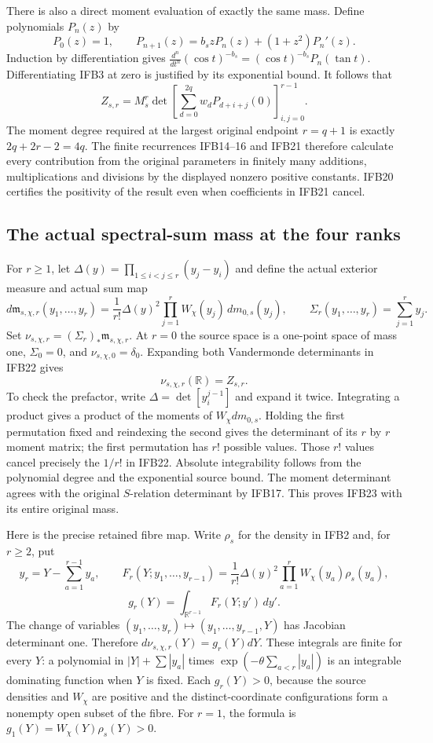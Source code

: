 There is also a direct moment evaluation of exactly the same mass.
Define polynomials $P_n(z)$ by
\[
 P_0(z)=1,\qquad
 P_{n+1}(z)=b_szP_n(z)+(1+z^2)P_n'(z).
\]
Induction by differentiation gives
$\frac{d^n}{dt^n}(\cos t)^{-b_s}
=(\cos t)^{-b_s}P_n(\tan t)$. Differentiating IFB3 at zero
is justified by its exponential bound. It follows that
\[
 \boxed{\displaystyle
 Z_{s,r}=M_s^r\det\left[
       \sum_{d=0}^{2q}w_dP_{d+i+j}(0)
                          \right]_{i,j=0}^{r-1}.}
 \tag{IFB21}
\]
The moment degree required at the largest original endpoint $r=q+1$
is exactly $2q+2r-2=4q$. The finite recurrences IFB14--16 and
IFB21 therefore calculate every contribution from the original
parameters in finitely many additions, multiplications and divisions
by the displayed nonzero positive constants. IFB20 certifies the
positivity of the result even when coefficients in IFB21 cancel.

\subsection{The actual spectral-sum mass at the four ranks}

For $r\geq1$, let $\Delta(y)=\prod_{1\leq i<j\leq r}(y_j-y_i)$
and define the actual exterior measure and actual sum map
\[
 d\mathfrak m_{s,\chi,r}(y_1,\ldots,y_r)
 =\frac1{r!}\Delta(y)^2\prod_{j=1}^r
       W_\chi(y_j)\,dm_{0,s}(y_j),\qquad
 \Sigma_r(y_1,\ldots,y_r)=\sum_{j=1}^ry_j.
 \tag{IFB22}
\]
Set $\nu_{s,\chi,r}=(\Sigma_r)_*\mathfrak m_{s,\chi,r}$.
At $r=0$ the source space is a one-point space of mass one,
$\Sigma_0=0$, and $\nu_{s,\chi,0}=\delta_0$.
Expanding both Vandermonde determinants in IFB22 gives
\[
 \nu_{s,\chi,r}(\mathbb R)=Z_{s,r}.
 \tag{IFB23}
\]
To check the prefactor, write $\Delta=\det[y_i^{j-1}]$ and
expand it twice. Integrating a product gives a product of the
moments of $W_\chi dm_{0,s}$. Holding the first permutation fixed
and reindexing the second gives the determinant of its $r$ by $r$
moment matrix; the first permutation has $r!$ possible values.
Those $r!$ values cancel precisely the $1/r!$ in IFB22. Absolute
integrability follows from the polynomial degree and the exponential
source bound. The moment determinant agrees with the original
$S$-relation determinant by IFB17. This proves IFB23 with its
entire original mass.

Here is the precise retained fibre map. Write $\rho_s$ for the
density in IFB2 and, for $r\geq2$, put
\[
 y_r=Y-\sum_{a=1}^{r-1}y_a,\qquad
 F_r(Y;y_1,\ldots,y_{r-1})
 =\frac1{r!}\Delta(y)^2\prod_{a=1}^r W_\chi(y_a)\rho_s(y_a),
\]
\[
 g_r(Y)=\int_{\mathbb R^{r-1}}F_r(Y;y')\,dy'.
 \tag{IFB24}
\]
The change of variables $(y_1,\ldots,y_r)\mapsto(y_1,\ldots,
y_{r-1},Y)$ has Jacobian determinant one. Therefore
$d\nu_{s,\chi,r}(Y)=g_r(Y)dY$. These integrals are finite for every
$Y$: a polynomial in $|Y|+\sum|y_a|$ times
$\exp(-\theta\sum_{a<r}|y_a|)$ is an integrable dominating
function when $Y$ is fixed. Each $g_r(Y)>0$, because the source
densities and $W_\chi$ are positive and the distinct-coordinate
configurations form a nonempty open subset of the fibre.
For $r=1$, the formula is $g_1(Y)=W_\chi(Y)\rho_s(Y)>0$.

